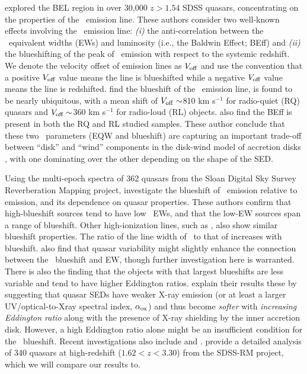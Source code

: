 \documentclass[fleqn,usenatbib]{mnras}
\begin{document}
\citet{Richards2011} explored the BEL region in over 30,000 $z > 1.54$
SDSS quasars, concentrating on the properties of the \civ\ emission
line. These authors consider two well-known effects involving the
\civ\ emission line: {\it (i)} the anti-correlation between the \civ\
equivalent widths (EWs) and luminosity (i.e., the Baldwin Effect;
BEff) and {\it (ii)} the blueshifting of the peak of \civ\ emission
with respect to the systemic redshift.  We denote the velocity offset
of emission lines as $V_{\rm off}$ and use the convention that a
positive $V_{\rm off}$ value means the line is blueshifted while a
negative $V_{\rm off}$ value means the line is redshifted.
\citet{Richards2011} find the blueshift of the \civ\ emission line, is
found to be nearly ubiquitous, with a mean shift of $V_{\rm off}
\sim$810 km s$^{-1}$ for radio-quiet (RQ) quasars and $V_{\rm off}
\sim$360 km s$^{-1}$ for radio-loud (RL) objects. \citet{Richards2011}
also find the BEff is present in both the RQ and RL studied samples.
These author conclude that these two \civ\ parameters (EQW and
blueshift) are capturing an important trade-off between ``disk'' and
``wind'' components in the disk-wind model of accretion disks
\citep[e.g.,][]{Murray1995, Elvis2000, Proga2000, Leighly2004b}, with
one dominating over the other depending on the shape of the SED.

Using the multi-epoch spectra of 362 quasars from the Sloan Digital
Sky Survey Reverberation Mapping \citep[SDSS-RM; ][]{Shen2015,
Shen2019} project, \citet{Sun2018} investigate the blueshift of \civ\
emission relative to \mgii emission, and its dependence on quasar
properties. These authors confirm that high-blueshift sources tend to
have low \civ\ EWs, and that the low-EW sources span a range of
blueshift. Other high-ionization lines, such as \heii, also show
similar blueshift properties. The ratio of the line width of \civ\ to
that of \mgii increases with blueshift. \citet{Sun2018} also find that
quasar variability might slightly enhance the connection between the
\civ\ blueshift and EW, though further investigation here is
warranted. There is also the finding that the objects with that
largest blueshifts are less variable and tend to have higher Eddington
ratios. \citet{Sun2018} explain their results these by suggesting that
quasar SEDs have weaker X-ray emission (or at least a larger UV/optical-to-Xray
spectral index, $\alpha_{\rm ox}$) and thus become {\it
softer} with {\it increasing Eddington ratio} along with the presence
of X-ray shielding by the inner accretion disk. However, a high
Eddington ratio alone might be an insufficient condition for the \civ\
blueshift. Recent investigations also include \citet{Meyer2019} and
\citet{Doan2019}. \citet{Dyer2019} provide a detailed analysis of 340
quasars at high-redshift ($1.62<z<3.30$) from the SDSS-RM project,
which we will compare our results to.
\end{document}
